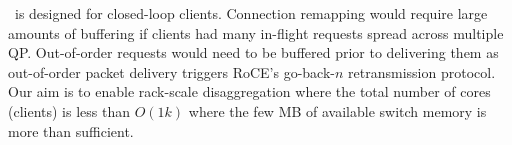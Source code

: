 \sword\ is designed for closed-loop clients. Connection remapping
would require large amounts of buffering if clients had many in-flight
requests spread across multiple QP. Out-of-order requests would need
to be buffered prior to delivering them as out-of-order packet delivery
triggers RoCE's go-back-$n$ retransmission protocol.
Our aim is to enable rack-scale disaggregation where the
total number of cores (clients) is less than $O(1k)$
where the few MB of available switch memory is more than
sufficient.


%

